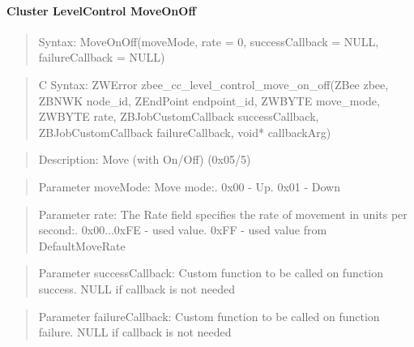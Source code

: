 \paragraph{Cluster LevelControl MoveOnOff}
\begin{quote}Syntax: MoveOnOff(moveMode, rate = 0, successCallback = NULL, failureCallback = NULL)\end{quote}
\begin{quote}C Syntax: ZWError zbee\_cc\_level\_control\_move\_on\_off(ZBee zbee, ZBNWK node\_id, ZEndPoint endpoint\_id, ZWBYTE move\_mode, ZWBYTE rate, ZBJobCustomCallback successCallback, ZBJobCustomCallback failureCallback, void* callbackArg)\end{quote}
\begin{quote}Description: Move (with On/Off) (0x05/5)\end{quote}
\begin{quote}Parameter moveMode: Move mode:. 0x00 - Up. 0x01 - Down\end{quote}
\begin{quote}Parameter rate: The Rate field specifies the rate of movement in units per second:. 0x00...0xFE - used value. 0xFF        - used value from DefaultMoveRate\end{quote}
\begin{quote}Parameter successCallback: Custom function to be called on function success. NULL if callback is not needed\end{quote}
\begin{quote}Parameter failureCallback: Custom function to be called on function failure. NULL if callback is not needed\end{quote}


